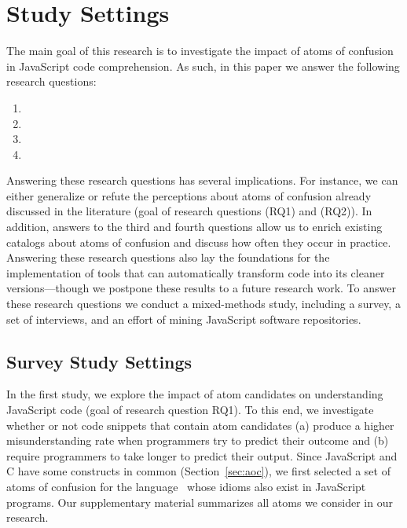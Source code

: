 \section{Study Settings}
\label{method}

The main goal of this research is to investigate the impact of atoms of confusion in JavaScript code comprehension. As such, in this paper we answer the following research questions: 

\begin{enumerate}[(RQ1)]
\item \rqa 
\item \rqb
\item \rqc  
\item \rqd
\end{enumerate}

 
Answering these research questions has several implications. For instance, we can either generalize or refute the perceptions about atoms of confusion already discussed in the literature (goal of research questions (RQ1) and (RQ2)). In addition, answers to the third and fourth questions allow us to enrich existing catalogs about atoms of confusion and discuss how often they occur in practice. Answering these research questions also lay the foundations for the implementation of tools that can automatically transform code into its cleaner versions---though we postpone these results to a future research work. To answer these research questions we conduct a mixed-methods study, including a survey, a set of interviews, and an effort of mining JavaScript software repositories.  


\subsection{Survey Study Settings}

In the first study, we explore the impact of atom candidates on
understanding JavaScript code (goal of research question RQ1).	
To this end, we investigate whether or not code snippets that
contain atom candidates (a) produce a higher
misunderstanding rate when programmers
try to predict their outcome and (b) require
programmers to take longer to predict their output.
Since JavaScript and C have some constructs in common (Section~\ref{sec:aoc}), we first selected a set of atoms of confusion for the \clang language~\cite{DBLP:conf/sigsoft/GopsteinIYDZYC17} whose idioms also exist in JavaScript programs. Our supplementary material
summarizes all atoms we consider in our research. 

